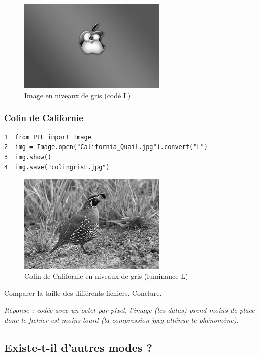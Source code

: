 \documentclass[11pt]{article}
\begin{document}
\begin{figure}[htbp]
\centering
\includegraphics[width=7cm]{pommegriseL.jpg}
\caption{Image en niveaux de gris (codé L)}
\end{figure}


\subsubsection{Colin de Californie}
\label{sec:orgae8ef4b}

\begin{verbatim}
1  from PIL import Image
2  img = Image.open("California_Quail.jpg").convert("L")
3  img.show()
4  img.save("colingrisL.jpg")
\end{verbatim}


\begin{figure}[htbp]
\centering
\includegraphics[width=7cm]{colingrisL.jpg}
\caption{Colin de Californie en niveaux de gris (luminance L)}
\end{figure}

Comparer la taille des différents fichiers. Conclure.



\emph{Réponse : codée avec un octet par pixel, l'image (les datas) prend moins de place donc le fichier est moins lourd (la compression jpeg atténue le phénomène).}

\subsection{Existe-t-il d'autres modes ?}
\label{sec:orgbf41a2b}
\end{document}
